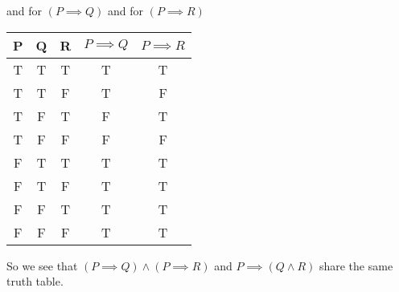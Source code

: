 \documentclass[12pt, oneside]{article}
\begin{document}
\begin{itemize}
\begin{center}
\begin{tabular}{ c|c|c|c|c}
              \end{tabular}
          \end{center}
          and for \((P \implies Q)\) and for \((P \implies R)\)
          \begin{center}
              \begin{tabular}{ c|c|c|c|c}
                  P & Q & R & \(P \implies Q\) & \(P \implies R\) \\
                  \hline
                  T & T & T & T                & T                \\
                  T & T & F & T                & F                \\
                  T & F & T & F                & T                \\
                  T & F & F & F                & F                \\
                  F & T & T & T                & T                \\
                  F & T & F & T                & T                \\
                  F & F & T & T                & T                \\
                  F & F & F & T                & T                \\
              \end{tabular}
          \end{center}

          So we see that \((P \implies Q) \wedge (P \implies R)\) and \(P \implies (Q \wedge R)\) share the same truth table.


\end{itemize}
\end{document}
